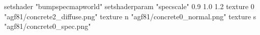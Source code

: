 setshader "bumpspecmapworld"
setshaderparam "specscale" 0.9 1.0 1.2
    texture 0 "agf81/concrete2_diffuse.png"
    texture n "agf81/concrete0_normal.png"
    texture s "agf81/concrete0_spec.png"